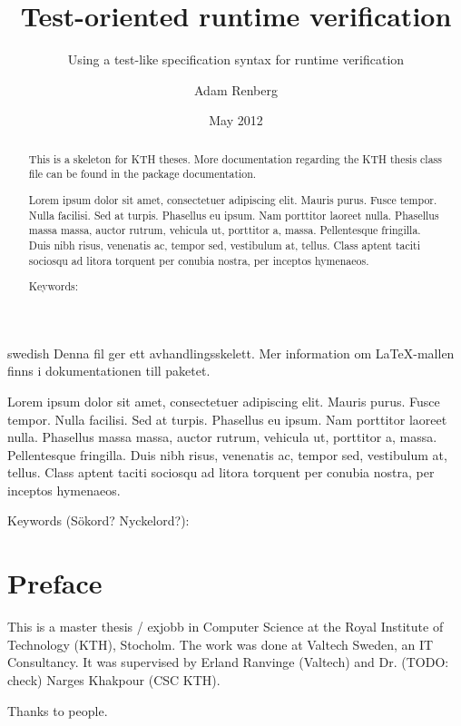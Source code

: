 \documentclass[a4paper,11pt]{kth-mag}
\title{Test-oriented runtime verification}
\subtitle{Using a test-like specification syntax for runtime verification}
\author{Adam Renberg}
\date{May 2012}
\begin{document}
\frontmatter
\pagestyle{empty}
\removepagenumbers
\maketitle

\begin{abstract}
  This is a skeleton for KTH theses. More documentation
  regarding the KTH thesis class file can be found in
  the package documentation.

Lorem ipsum dolor sit amet, consectetuer adipiscing elit. Mauris
purus. Fusce tempor. Nulla facilisi. Sed at turpis. Phasellus eu
ipsum. Nam porttitor laoreet nulla. Phasellus massa massa, auctor
rutrum, vehicula ut, porttitor a, massa. Pellentesque fringilla. Duis
nibh risus, venenatis ac, tempor sed, vestibulum at, tellus. Class
aptent taciti sociosqu ad litora torquent per conubia nostra, per
inceptos hymenaeos.

\bigskip\noindent
Keywords: 
\end{abstract}
\clearpage

\begin{foreignabstract}{swedish}
  Denna fil ger ett avhandlingsskelett.
  Mer information om \LaTeX-mallen finns i
  dokumentationen till paketet.

Lorem ipsum dolor sit amet, consectetuer adipiscing elit. Mauris
purus. Fusce tempor. Nulla facilisi. Sed at turpis. Phasellus eu
ipsum. Nam porttitor laoreet nulla. Phasellus massa massa, auctor
rutrum, vehicula ut, porttitor a, massa. Pellentesque fringilla. Duis
nibh risus, venenatis ac, tempor sed, vestibulum at, tellus. Class
aptent taciti sociosqu ad litora torquent per conubia nostra, per
inceptos hymenaeos.

\bigskip\noindent
Keywords (S\"okord? Nyckelord?): 
\end{foreignabstract}
\clearpage


\pagestyle{newchap}
\chapter*{Preface}

This is a master thesis / exjobb in Computer Science at the Royal Institute of Technology (KTH), Stocholm. The work was done at Valtech Sweden, an IT Consultancy. It was supervised by Erland Ranvinge (Valtech) and Dr. (TODO: check) Narges Khakpour (CSC KTH).

Thanks to people.
\clearpage

\pagestyle{newchap}
\tableofcontents*
\mainmatter
\end{document}
